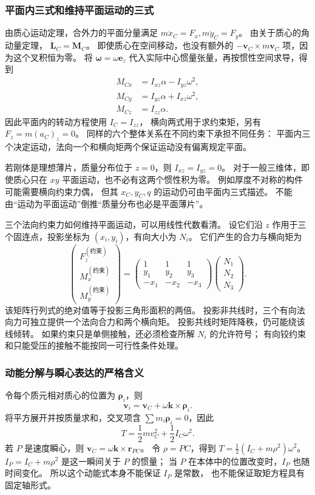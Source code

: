 \documentclass[UTF8,zihao=-4,fontset=fandol,a4paper]{ctexart}
\newcommand{\vect}[1]{\bm{#1}}
\begin{document}
\subsubsection*{平面内三式和维持平面运动的三式}
由质心运动定理，合外力的平面分量满足
$m\ddot x_C=F_x,m\ddot y_C=F_y$。
由关于质心的角动量定理，
$\dot{\vect L}_C=\vect M_C$。
即使质心在空间移动，也没有额外的
$-\vect v_C\times m\vect v_C$ 项，因为这个叉积恒为零。
将 $\vect\omega=\omega\vect e_z$ 代入实际中心惯量张量，再按惯性空间求导，得到
\begin{align*}
M_{Cx}&=I_{xz}\alpha-I_{yz}\omega^2,\\
M_{Cy}&=I_{yz}\alpha+I_{xz}\omega^2,\\
M_{Cz}&=I_{zz}\alpha.
\end{align*}
因此平面内的转动方程使用 $I_C=I_{zz}$，
横向两式用于求约束矩，另有 $F_z=m(a_C)_z=0$。
同样的六个整体关系在不同约束下承担不同任务：
平面内三个决定运动，法向一个和横向矩两个保证运动没有偏离规定平面。

若刚体是理想薄片，质量分布位于 $z=0$，则 $I_{xz}=I_{yz}=0$。
对于一般三维体，即使质心只在 $xy$ 平面运动，也不必有这两个惯性积为零。
例如厚度不对称的构件可能需要横向约束力偶，
但其 $x_C,y_C,q$ 的运动仍可由平面内三式描述。
不能由“运动为平面运动”倒推“质量分布也必是平面薄片”。

三个法向约束力如何维持平面运动，可以用线性代数看清。
设它们沿 $z$ 作用于三个固连点，投影坐标为 $(x_i,y_i)$，有向大小为 $N_i$。
它们产生的合力与横向矩为
\[
\begin{pmatrix}F_z^{(\text{约束})}\\M_x^{(\text{约束})}\\M_y^{(\text{约束})}\end{pmatrix}
=
\begin{pmatrix}
1&1&1\\y_1&y_2&y_3\\-x_1&-x_2&-x_3
\end{pmatrix}
\begin{pmatrix}N_1\\N_2\\N_3\end{pmatrix}.
\]
该矩阵行列式的绝对值等于投影三角形面积的两倍。
投影非共线时，三个有向法向力可独立提供一个法向合力和两个横向矩。
投影共线时矩阵降秩，仍可能绕该线倾转。
如果约束只是单侧接触，还必须检查所解 $N_i$ 的允许符号；
有向铰约束和只能受压的接触不能按同一可行性条件处理。

\subsubsection*{动能分解与瞬心表达的严格含义}
令每个质元相对质心的位置为 $\vect\rho_i$，则
\[
\vect v_i=\vect v_C+\omega\vect k\times\vect\rho_i.
\]
将平方展开并按质量求和，交叉项含
$\sum m_i\vect\rho_i=0$，因此
\[
T=\frac12mv_C^2+\frac12I_C\omega^2.
\]
若 $P$ 是速度瞬心，则 $\vect v_C=\omega\vect k\times\vect r_{PC}$。
令 $\rho=PC$，得到 $T=\tfrac12(I_C+m\rho^2)\omega^2$。
$I_P=I_C+m\rho^2$ 是这一瞬间关于 $P$ 的惯量；
当 $P$ 在本体中的位置改变时，$I_P$ 也随时间变化。
所以这个动能式本身不能保证 $I_P$ 是常数，
也不能保证取矩方程具有固定轴形式。
\end{document}
